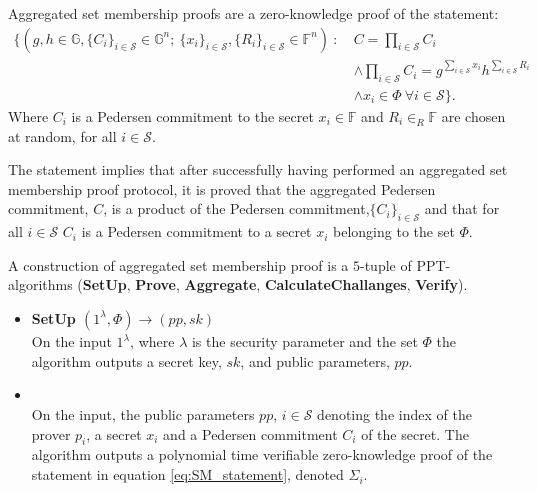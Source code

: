 \vspace{10pt}
\begin{Mydef}
\label{def:GeneralAggregation}
Aggregated set membership proofs are a zero-knowledge proof of the statement:
\begin{equation}
\begin{aligned} 
\label{eq:SMagg_statement}
    \big\{(g,h\in\mathds{G},\{C_i\}_{i\in\mathcal{S}}\in\mathds{G}^n;\:\{x_i\}_{i\in\mathcal{S}},\{R_i\}_{i\in\mathcal{S}}\in\mathds{F}^n)\:: 
\: &C=\prod_{i\in\mathcal{S}}C_i 
\\
 &\wedge \prod_{i\in\mathcal{S}}C_i  =   g^{\sum_{i\in\mathcal{S}}x_i} h^{\sum_{i\in\mathcal{S}}R_i} 
 \\
 &\wedge x_i \in \Phi \: \forall i\in\mathcal{S} \big\}.
\end{aligned}
\end{equation}
Where $C_i$ is a Pedersen commitment to the secret $x_i\in\mathds{F}$ and $R_i \in_R\mathds{F}$ are chosen at random, for all $i\in\mathcal{S}$.  

The statement implies that after successfully having performed an aggregated set membership proof protocol, it is proved that the aggregated Pedersen commitment, $C$, is a product of the Pedersen commitment,$\{C_i\}_{i\in\mathcal{S}}$ and that for all $i\in\mathcal{S}$ $C_i$ is a Pedersen commitment to a secret $x_i$ belonging to the set $\Phi$.

A construction of aggregated set membership proof  is a $5$-tuple of PPT-algorithms (\textbf{SetUp}, \textbf{Prove}, \textbf{Aggregate}, \textbf{CalculateChallanges}, \textbf{Verify}).
\\
\begin{itemize}
  \item\textbf{SetUp $(1^\lambda, \Phi)\xrightarrow[]{}(pp,sk)$}\\
On the input $1^\lambda$, where $\lambda$ is the security parameter and the set $\Phi$ the algorithm outputs a secret key, $sk$, and public parameters, $pp$. 

\item{}\\
On the input, the public parameters $pp$, $i\in\mathcal{S}$ denoting the index of the prover $p_i$, a secret $x_i$ and a Pedersen commitment $C_i$ of the secret.  The algorithm outputs a polynomial time verifiable zero-knowledge proof of the statement in equation \eqref{eq:SM_statement}, denoted $\Sigma_i$.


\end{itemize}
\end{Mydef}
